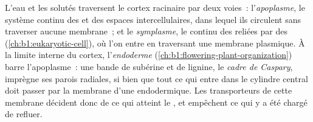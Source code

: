 \begin{definition}\label{def:b1:plant-water-minerals:pathways}
L'eau et les solutés traversent le cortex racinaire par deux voies~:
l'\emph{apoplasme}, le système continu des  et des
espaces intercellulaires, dans lequel ils circulent sans traverser
aucune membrane~; et le \emph{symplasme}, le  continu des
 reliées par des  (\cref{ch:b1:eukaryotic-cell}),
où l'on entre en traversant une membrane plasmique. À la limite interne
du cortex, l'\emph{endoderme}
(\cref{ch:b1:flowering-plant-organization}) barre l'apoplasme~: une
bande de subérine et de lignine, le \emph{cadre de Caspary}, imprègne
ses parois radiales, si bien que tout ce qui entre dans le cylindre
central doit passer par la membrane d'une  endodermique. Les
transporteurs de cette membrane décident donc de ce qui atteint le
, et empêchent ce qui y a été chargé de refluer.
\end{definition}

